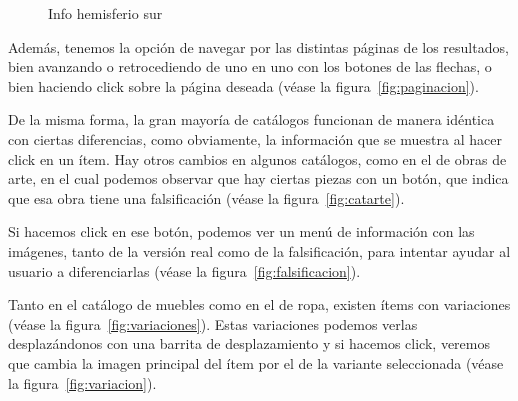 \begin{figure}[!htb]
\begin{minipage}{0.48\textwidth}
		\caption{Info hemisferio sur}
		\label{fig:infosur}
	\end{minipage}
\end{figure}

Además, tenemos la opción de navegar por las distintas páginas de los resultados, bien avanzando o retrocediendo de uno en uno con los botones de las flechas, o bien haciendo click sobre la página deseada {(v\'ease la figura~\ref{fig:paginacion})}.\\


\clearpage

De la misma forma, la gran mayoría de catálogos funcionan de manera idéntica con ciertas diferencias, como obviamente, la información que se muestra al hacer click en un ítem. Hay otros cambios en algunos catálogos, como en el de obras de arte, en el cual podemos observar que hay ciertas piezas con un botón, que indica que esa obra tiene una falsificación {(v\'ease la figura~\ref{fig:catarte})}.\\


Si hacemos click en ese botón, podemos ver un menú de información con las imágenes, tanto de la versión real como de la falsificación, para intentar ayudar al usuario a diferenciarlas {(v\'ease la figura~\ref{fig:falsificacion})}.\\


\clearpage

Tanto en el catálogo de muebles como en el de ropa, existen ítems con variaciones {(v\'ease la figura~\ref{fig:variaciones})}. Estas variaciones podemos verlas desplazándonos con una barrita de desplazamiento y si hacemos click, veremos que cambia la imagen principal del ítem por el de la variante seleccionada {(v\'ease la figura~\ref{fig:variacion})}.\\

